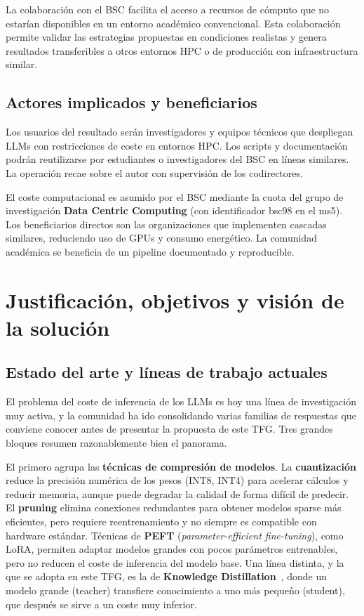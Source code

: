 \documentclass[11pt,a4paper]{article}
\begin{document}
La colaboración con el BSC facilita el acceso a recursos de cómputo que no estarían disponibles en un entorno académico convencional. Esta colaboración permite validar las estrategias propuestas en condiciones realistas y genera resultados transferibles a otros entornos HPC o de producción con infraestructura similar.

\subsection{Actores implicados y beneficiarios}

Los usuarios del resultado serán investigadores y equipos técnicos que despliegan LLMs con restricciones de coste en entornos HPC. Los scripts y documentación podrán reutilizarse por estudiantes o investigadores del BSC en líneas similares. La operación recae sobre el autor con supervisión de los codirectores.

El coste computacional es asumido por el BSC mediante la cuota del grupo de investigación \textbf{Data Centric Computing} (con identificador bsc98 en el ms5). Los beneficiarios directos son las organizaciones que implementen cascadas similares, reduciendo uso de GPUs y consumo energético. La comunidad académica se beneficia de un pipeline documentado y reproducible.

\section{Justificación, objetivos y visión de la solución}

\subsection{Estado del arte y líneas de trabajo actuales}

El problema del coste de inferencia de los LLMs es hoy una línea de investigación muy activa, y la comunidad ha ido consolidando varias familias de respuestas que conviene conocer antes de presentar la propuesta de este TFG. Tres grandes bloques resumen razonablemente bien el panorama.

El primero agrupa las \textbf{técnicas de compresión de modelos}. La \textbf{cuantización} reduce la precisión numérica de los pesos (INT8, INT4) para acelerar cálculos y reducir memoria, aunque puede degradar la calidad de forma difícil de predecir. El \textbf{pruning} elimina conexiones redundantes para obtener modelos sparse más eficientes, pero requiere reentrenamiento y no siempre es compatible con hardware estándar. Técnicas de \textbf{PEFT} (\textit{parameter-efficient fine-tuning}), como LoRA, permiten adaptar modelos grandes con pocos parámetros entrenables, pero no reducen el coste de inferencia del modelo base. Una línea distinta, y la que se adopta en este TFG, es la de \textbf{Knowledge Distillation}~\cite{hinton2015distilling}, donde un modelo grande (teacher) transfiere conocimiento a uno más pequeño (student), que después se sirve a un coste muy inferior.
\end{document}
